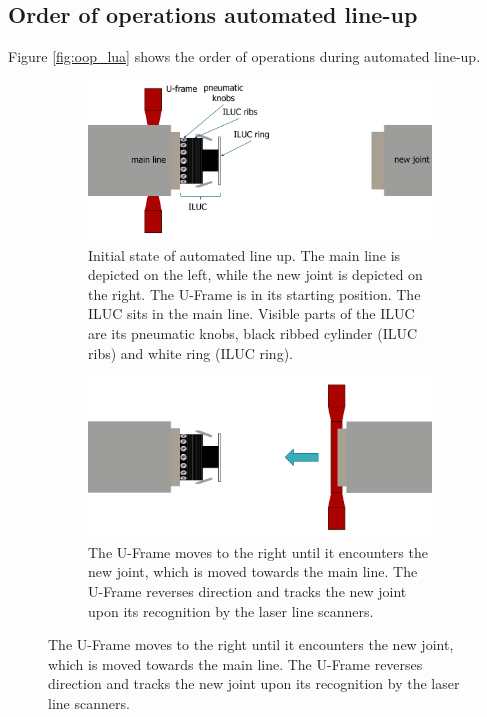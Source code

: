 \newpage
\subsection{Order of operations automated line-up} \label{ssec:oop_lua}
Figure \ref{fig:oop_lua} shows the order of operations during automated line-up.
\begin{figure}[H]
    \centering
    \begin{subfigure}{0.7\textwidth}
        \includegraphics[width=\textwidth ]{images/lua_oop_intro.png}
        \caption{Initial state of automated line up. The main line is depicted on the left,
            while the new joint is depicted on the right. The U-Frame is in its starting position. The ILUC
            sits in the main line. Visible parts of the ILUC are its pneumatic knobs, black ribbed cylinder (ILUC ribs)
            and white ring (ILUC ring).}
        \label{fig:oop_intro}
    \end{subfigure}
    \begin{subfigure}{0.7\textwidth}
        \includegraphics[width=\textwidth ]{images/lua_oop_track_new_joint.png}
        \caption{The U-Frame moves to the right until it encounters the new joint, which is moved towards the main line.
            The U-Frame reverses direction and tracks the new joint upon its recognition by the laser line scanners.}

\end{subfigure}
\end{figure}
